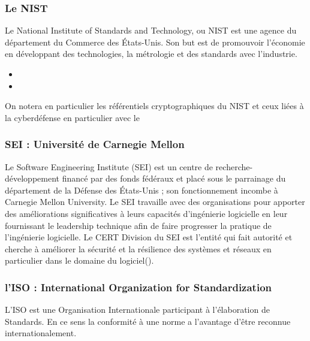\subsubsection{Le NIST}
Le National Institute of Standards and Technology, ou NIST est une agence du département du Commerce des États-Unis. Son but est de promouvoir l'économie en développant des technologies, la métrologie et des standards avec l'industrie. 

\begin{itemize}
  \item {}
  \item {}
\end{itemize}

On notera en particulier les référentiels cryptographiques du NIST et ceux liées à la cyberdéfense en particulier avec le 

\subsubsection{SEI : Université de Carnegie Mellon}

Le Software Engineering Institute (SEI) est un centre de recherche-développement financé par des fonds fédéraux et placé sous le parrainage du département de la Défense des États-Unis ; son fonctionnement incombe à Carnegie Mellon University. Le SEI travaille avec des organisations pour apporter des améliorations significatives à leurs capacités d’ingénierie logicielle en leur fournissant le leadership technique afin de faire progresser la pratique de l’ingénierie logicielle. Le CERT Division du SEI est l’entité qui fait autorité et cherche à améliorer la sécurité et la résilience des systèmes et réseaux en particulier dans le domaine du logiciel().

\subsubsection{l'ISO : International Organization for Standardization }


L’ISO est une Organisation Internationale participant à l’élaboration de Standards. En ce sens la conformité à une norme a l’avantage d’être reconnue internationalement.
 
